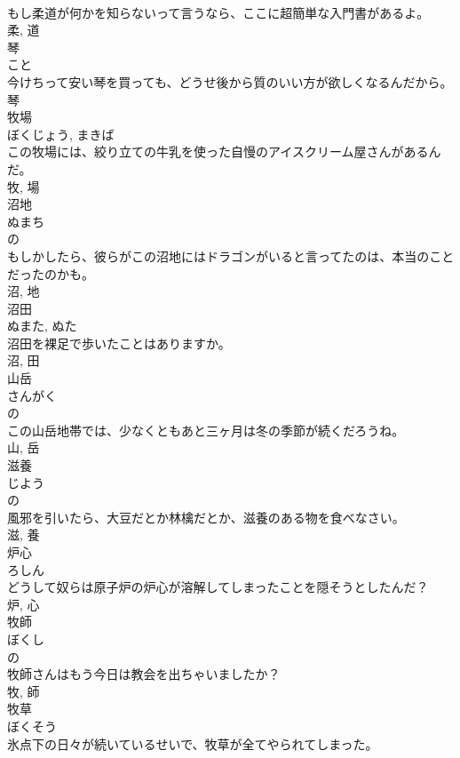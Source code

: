 \documentclass[8pt]{extreport}
\begin{document}
\begin{CJK}{UTF8}{min}
\\	もし柔道が何かを知らないって言うなら、ここに超簡単な入門書があるよ。	
\\	柔, 道	
\\	琴	
\\	こと	
\\	今けちって安い琴を買っても、どうせ後から質のいい方が欲しくなるんだから。	
\\	琴	
\\	牧場	
\\	ぼくじょう, まきば	
\\	この牧場には、絞り立ての牛乳を使った自慢のアイスクリーム屋さんがあるんだ。	
\\	牧, 場	
\\	沼地	
\\	ぬまち	
\\	の 
\\	もしかしたら、彼らがこの沼地にはドラゴンがいると言ってたのは、本当のことだったのかも。	
\\	沼, 地	
\\	沼田	
\\	ぬまた, ぬた	
\\	沼田を裸足で歩いたことはありますか。	
\\	沼, 田	
\\	山岳	
\\	さんがく	
\\	の 
\\	この山岳地帯では、少なくともあと三ヶ月は冬の季節が続くだろうね。	
\\	山, 岳	
\\	滋養	
\\	じよう	
\\	の 
\\	風邪を引いたら、大豆だとか林檎だとか、滋養のある物を食べなさい。	
\\	滋, 養	
\\	炉心	
\\	ろしん	
\\	どうして奴らは原子炉の炉心が溶解してしまったことを隠そうとしたんだ？	
\\	炉, 心	
\\	牧師	
\\	ぼくし	
\\	の 
\\	牧師さんはもう今日は教会を出ちゃいましたか？	
\\	牧, 師	
\\	牧草	
\\	ぼくそう	
\\	氷点下の日々が続いているせいで、牧草が全てやられてしまった。	

\end{CJK}
\end{document}
